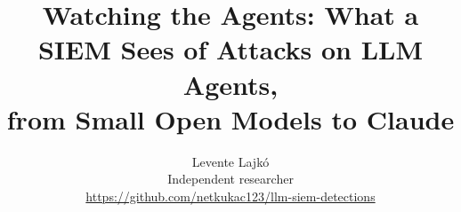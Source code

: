 \documentclass[10pt]{article}
\title{Watching the Agents: What a SIEM Sees of Attacks on LLM Agents,\\from Small Open Models to Claude}
\author{Levente Lajkó\\\small Independent researcher\\\small\url{https://github.com/netkukac123/llm-siem-detections}}
\date{}
\begin{document}
\maketitle

\begin{abstract}

\end{abstract}















\appendix

\end{document}
